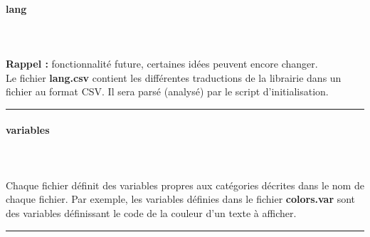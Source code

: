\documentclass[a4paper,10pt]{article}
\begin{document}
\paragraph{lang}\mbox{}\\\mbox{}\\
\textbf{Rappel :} fonctionnalité future, certaines idées peuvent encore changer.\\[1\baselineskip]

Le fichier \textbf{\color{lime}lang.csv\color{white}} contient les différentes traductions de la librairie dans un fichier au format CSV. Il sera parsé (analysé) par le script d'initialisation.\\[1\baselineskip]



\par\noindent\rule{\textwidth}{0.4pt}

\paragraph{variables}\mbox{}\\\mbox{}\\
Chaque fichier définit des variables propres aux catégories décrites dans le nom de chaque fichier. Par exemple, les variables définies dans le fichier \textbf{\color{lime}colors.var\color{white}} sont des variables définissant le code de la couleur d'un texte à afficher.\\[1\baselineskip]



\color{blue}\par\noindent\rule{\textwidth}{0.4pt}\color{white}

\color{blue}
\end{document}

